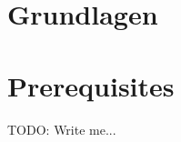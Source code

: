 \ifisGerman
    \chapter{Grundlagen}
\else
    \chapter{Prerequisites}
\fi
\label{sec:basics}

TODO: Write me...

